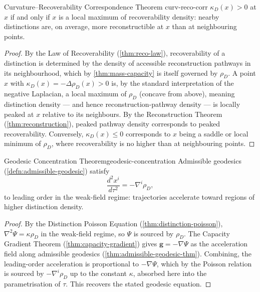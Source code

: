 \documentclass[12pt,twoside,openright]{book}
\begin{document}
\begin{theorem}{Curvature--Recoverability Correspondence Theorem}%
  {curv-reco-corr}
  $\kappa_D(x) > 0$ at $x$ if and only if $x$ is a local
  maximum of recoverability density: nearby distinctions
  are, on average, more reconstructible at $x$ than at
  neighbouring points.
\end{theorem}

\begin{proof}
  By the Law of Recoverability (\cref{thm:reco-law}),
  recoverability of a distinction is determined by the
  density of accessible reconstruction pathways in its
  neighbourhood, which by \cref{thm:mass-capacity} is itself
  governed by $\rho_D$. A point $x$ with $\kappa_D(x) =
  -\Delta\rho_D(x) > 0$ is, by the standard interpretation of
  the negative Laplacian, a local maximum of $\rho_D$
  (concave from above), meaning distinction density --- and
  hence reconstruction-pathway density --- is locally
  peaked at $x$ relative to its neighbours. By the
  Reconstruction Theorem (\cref{thm:reconstruction}), peaked
  pathway density corresponds to peaked recoverability.
  Conversely, $\kappa_D(x) \le 0$ corresponds to $x$ being a
  saddle or local minimum of $\rho_D$, where recoverability
  is no higher than at neighbouring points.
\end{proof}

\begin{theorem}{Geodesic Concentration Theorem}{geodesic-concentration}
  Admissible geodesics (\cref{defn:admissible-geodesic})
  satisfy
  \[
    \frac{d^2 x^i}{d\tau^2} = -\nabla^i \rho_D,
  \]
  to leading order in the weak-field regime: trajectories
  accelerate toward regions of higher distinction density.
\end{theorem}

\begin{proof}
  By the Distinction Poisson Equation
  (\cref{thm:distinction-poisson}), $\nabla^2\Psi =
  \kappa\rho_D$ in the weak-field regime, so
  $\Psi$ is sourced by $\rho_D$. The Capacity Gradient
  Theorem (\cref{thm:capacity-gradient}) gives
  $\mathbf{g} = -\nabla\Psi$ as the acceleration field along
  admissible geodesics (\cref{thm:admissible-geodesic-thm}).
  Combining, the leading-order acceleration is proportional
  to $-\nabla\Psi$, which by the Poisson relation is sourced
  by $-\nabla^i\rho_D$ up to the constant $\kappa$, absorbed
  here into the parametrisation of $\tau$. This recovers the
  stated geodesic equation.
\end{proof}
\end{document}
